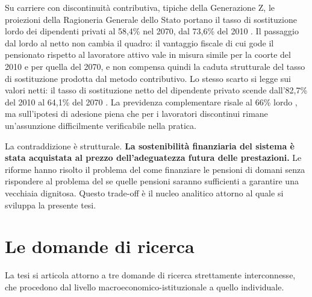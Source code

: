 Su carriere con discontinuità contributiva, tipiche della Generazione Z, le
proiezioni della Ragioneria Generale dello Stato portano il tasso di sostituzione
lordo dei dipendenti privati al 58,4\% nel 2070, dal 73,6\% del 2010
\cite{MEF_RGS2025}. Il passaggio dal lordo al netto non cambia il quadro: il
vantaggio fiscale di cui gode il pensionato rispetto al lavoratore attivo vale
in misura simile per la coorte del 2010 e per quella del 2070, e non compensa
quindi la caduta strutturale del tasso di sostituzione prodotta dal metodo
contributivo. Lo stesso scarto si legge sui valori netti: il tasso di sostituzione netto del
dipendente privato scende dall'82,7\% del 2010 al 64,1\% del 2070
\cite{MEF_RGS2025, MEF_RGS2025_NdA}. La previdenza
complementare risale al 66\% lordo \cite{MEF_RGS2025}, ma sull'ipotesi di adesione
piena che per i lavoratori discontinui rimane un'assunzione difficilmente
verificabile nella pratica.

La contraddizione è strutturale. \textbf{La sostenibilità finanziaria del sistema
è stata acquistata al prezzo dell'adeguatezza futura delle prestazioni.} Le riforme
hanno risolto il problema del come finanziare le pensioni di domani senza rispondere
al problema del se quelle pensioni saranno sufficienti a garantire una vecchiaia
dignitosa. Questo trade-off è il nucleo analitico attorno al quale si sviluppa
la presente tesi.

\section*{Le domande di ricerca}

La tesi si articola attorno a tre domande di ricerca strettamente interconnesse,
che procedono dal livello macroeconomico-istituzionale a quello individuale.

